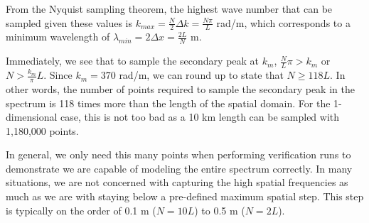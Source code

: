 From the Nyquist sampling theorem, the highest wave number that can be sampled given these values is $k_{max} = \frac{N}{2}\Delta k = \frac{N\pi}{L}$ rad/m, which corresponds to a minimum wavelength of $\lambda_{min} = 2\Delta x = \frac{2L}{N}$ m.

Immediately, we see that to sample the secondary peak at $k_m$, $\frac{N}{L}\pi > k_m$ or $N > \frac{k_m}{\pi}L$. Since $k_m = 370$ rad/m, we can round up to state that $N \geq 118L$. In other words, the number of points required to sample the secondary peak in the spectrum is 118 times more than the length of the spatial domain. For the 1-dimensional case, this is not too bad as a 10 km length can be sampled with 1,180,000 points. 

In general, we only need this many points when performing verification runs to demonstrate we are capable of modeling the entire spectrum correctly. In many situations, we are not concerned with capturing the high spatial frequencies as much as we are with staying below a pre-defined maximum spatial step. This step is typically on the order of 0.1 m ($N = 10L$) to 0.5 m ($N = 2L$).


